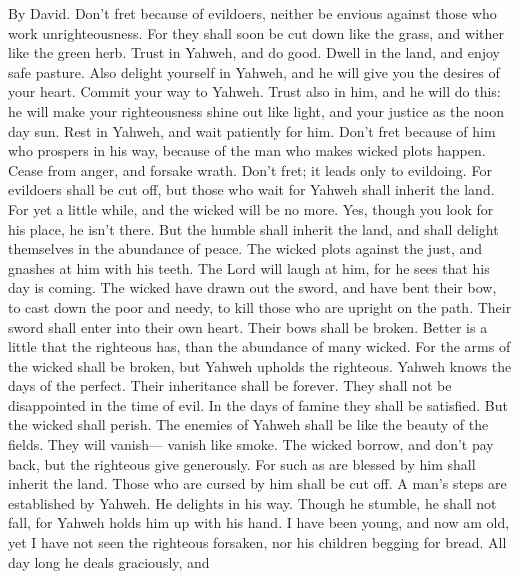 By David.  Don't fret because of evildoers, neither be
envious against those who work unrighteousness.  For they
shall soon be cut down like the grass, and wither like the green herb.
 Trust in Yahweh, and do good. Dwell in the land, and enjoy
safe pasture.  Also delight yourself in Yahweh, and he will
give you the desires of your heart.  Commit your way to
Yahweh. Trust also in him, and he will do this:  he will
make your righteousness shine out like light, and your justice as the
noon day sun.  Rest in Yahweh, and wait patiently for him.
Don't fret because of him who prospers in his way, because of the man
who makes wicked plots happen.  Cease from anger, and
forsake wrath. Don't fret; it leads only to evildoing.  For
evildoers shall be cut off, but those who wait for Yahweh shall inherit
the land.  For yet a little while, and the wicked will be
no more. Yes, though you look for his place, he isn't there.
 But the humble shall inherit the land, and shall delight
themselves in the abundance of peace.  The wicked plots
against the just, and gnashes at him with his teeth.  The
Lord will laugh at him, for he sees that his day is coming.
 The wicked have drawn out the sword, and have bent their
bow, to cast down the poor and needy, to kill those who are upright on
the path.  Their sword shall enter into their own heart.
Their bows shall be broken.  Better is a little that the
righteous has, than the abundance of many wicked.  For the
arms of the wicked shall be broken, but Yahweh upholds the righteous.
 Yahweh knows the days of the perfect. Their inheritance
shall be forever.  They shall not be disappointed in the
time of evil. In the days of famine they shall be satisfied.
 But the wicked shall perish. The enemies of Yahweh shall
be like the beauty of the fields. They will vanish--- vanish like smoke.
 The wicked borrow, and don't pay back, but the righteous
give generously.  For such as are blessed by him shall
inherit the land. Those who are cursed by him shall be cut off.
 A man's steps are established by Yahweh. He delights in
his way.  Though he stumble, he shall not fall, for Yahweh
holds him up with his hand.  I have been young, and now am
old, yet I have not seen the righteous forsaken, nor his children
begging for bread.  All day long he deals graciously, and
